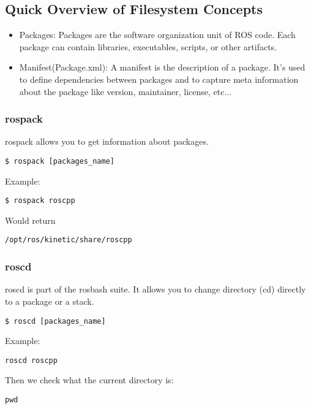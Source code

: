 \subsection{Quick Overview of Filesystem Concepts}

\begin{itemize}
	\item Packages: Packages are the software organization unit of ROS code. Each package can contain libraries, executables, scripts, or other artifacts.
	\item Manifest(Package.xml): A manifest is the description of a package. It's used to define dependencies between packages and to capture meta information about the package like version, maintainer, license, etc...
\end{itemize}

\subsubsection{rospack}

rospack allows you to get information about packages.

\begin{lstlisting}[breaklines=True language=bash]
$ rospack [packages_name]
\end{lstlisting}

Example:
\begin{lstlisting}[breaklines=True language=bash]
$ rospack roscpp
\end{lstlisting}

Would return
\begin{lstlisting}[breaklines=True language=bash]
	/opt/ros/kinetic/share/roscpp
\end{lstlisting}

\subsubsection{roscd}
roscd is part of the rosbash suite. It allows you to change directory (cd) directly to a package or a stack.

\begin{lstlisting}[breaklines=True language=bash]
$ roscd [packages_name]
\end{lstlisting}

Example:
\begin{lstlisting}[breaklines=True language=bash]
roscd roscpp
\end{lstlisting}

Then we check what the current directory is:
\begin{lstlisting}[breaklines=True language=bash]
pwd
\end{lstlisting}

